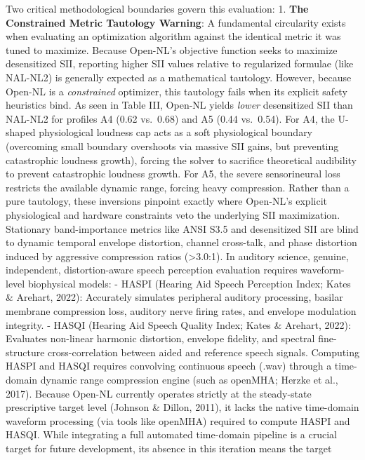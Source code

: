 \documentclass[
  12pt,
]{article}
\begin{document}
Two critical methodological boundaries govern this evaluation: 1.
\textbf{The Constrained Metric Tautology Warning}: A fundamental
circularity exists when evaluating an optimization algorithm against the
identical metric it was tuned to maximize. Because Open-NL's objective
function seeks to maximize desensitized SII, reporting higher SII values
relative to regularized formulae (like NAL-NL2) is generally expected as
a mathematical tautology. However, because Open-NL is a
\emph{constrained} optimizer, this tautology fails when its explicit
safety heuristics bind. As seen in Table III, Open-NL yields
\emph{lower} desensitized SII than NAL-NL2 for profiles A4 (0.62
vs.~0.68) and A5 (0.44 vs.~0.54). For A4, the U-shaped physiological
loudness cap acts as a soft physiological boundary (overcoming small
boundary overshoots via massive SII gains, but preventing catastrophic
loudness growth), forcing the solver to sacrifice theoretical audibility
to prevent catastrophic loudness growth. For A5, the severe
sensorineural loss restricts the available dynamic range, forcing heavy
compression. Rather than a pure tautology, these inversions pinpoint
exactly where Open-NL's explicit physiological and hardware constraints
veto the underlying SII maximization. Stationary band-importance metrics
like ANSI S3.5 and desensitized SII are blind to dynamic temporal
envelope distortion, channel cross-talk, and phase distortion induced by
aggressive compression ratios (\textgreater3.0:1). In auditory science,
genuine, independent, distortion-aware speech perception evaluation
requires waveform-level biophysical models: - HASPI (Hearing Aid Speech
Perception Index; Kates \& Arehart, 2022): Accurately simulates
peripheral auditory processing, basilar membrane compression loss,
auditory nerve firing rates, and envelope modulation integrity. - HASQI
(Hearing Aid Speech Quality Index; Kates \& Arehart, 2022): Evaluates
non-linear harmonic distortion, envelope fidelity, and spectral
fine-structure cross-correlation between aided and reference speech
signals. Computing HASPI and HASQI requires convolving continuous speech
(.wav) through a time-domain dynamic range compression engine (such as
openMHA; Herzke et al., 2017). Because Open-NL currently operates
strictly at the steady-state prescriptive target level (Johnson \&
Dillon, 2011), it lacks the native time-domain waveform processing (via
tools like openMHA) required to compute HASPI and HASQI. While
integrating a full automated time-domain pipeline is a crucial target
for future development, its absence in this iteration means the target
\end{document}
